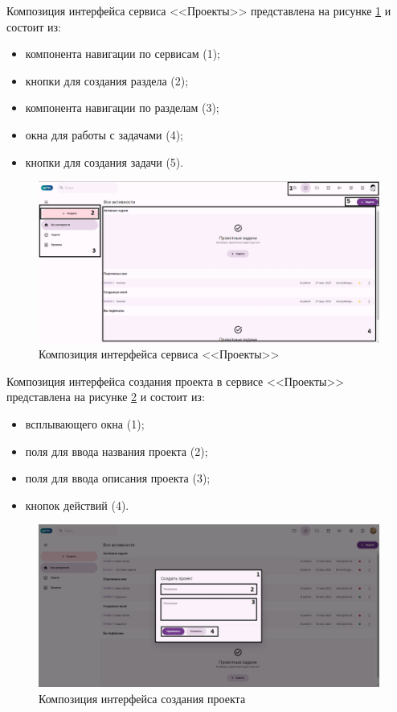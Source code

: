 Композиция интерфейса сервиса <<Проекты>> представлена на рисунке \ref{templ:image7} и состоит из:
\begin{itemize}
  \item компонента навигации по сервисам (1);
  \item кнопки для создания раздела (2);
  \item компонента навигации по разделам (3);
  \item окна для работы с задачами (4);
  \item кнопки для создания задачи (5).
\end{itemize}
\begin{figure}[H]
	\centering
	\includegraphics[width=1\linewidth]{images/проекты}
	\caption{Композиция интерфейса сервиса <<Проекты>>}
	\label{templ:image7}
\end{figure}

Композиция интерфейса создания проекта в сервисе <<Проекты>> представлена на рисунке \ref{templ:image7b} и состоит из:
\begin{itemize}
  \item всплывающего окна (1);
  \item поля для ввода названия проекта (2);
  \item поля для ввода описания проекта (3);
  \item кнопок действий (4).
\end{itemize}
\begin{figure}[H]
	\centering
	\includegraphics[width=1\linewidth]{images/проекты2}
	\caption{Композиция интерфейса создания проекта}
	\label{templ:image7b}
\end{figure}


